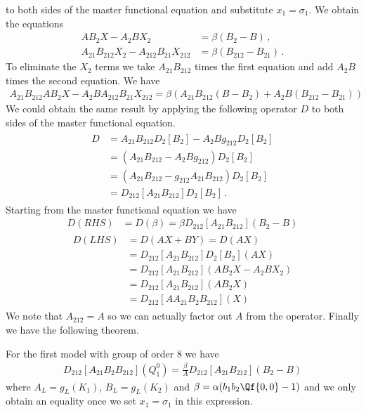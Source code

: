 to both sides of the master functional equation and substitute $x_1 = \sigma_1$. We obtain the equations
\begin{align}
	 AB_2 X - A_2 B X_2 &= \beta(B_2 - B)\,,\\
	  A_{21}B_{212} X_2 - A_{212} B_{21} X_{212} &= \beta(B_{212}-B_{21})\,.
\end{align}
To eliminate the $X_2$ terms we take $A_{21}B_{212}$ times the first equation and add $A_2 B$ times the second equation. We have
\begin{align}
	A_{21}B_{212}AB_2 X - A_2 BA_{212} B_{21} X_{212} = \beta(A_{21}B_{212}(B-B_2)+A_2 B(B_{212}-B_{21}))
\end{align}
We could obtain the same result by applying the following operator $D$ to both sides of the master functional equation.
\begin{align}\begin{split}
	D &=A_{21}B_{212} D_2[B_2] - A_2 B g_{212}D_2[B_2]\\
	   &= (A_{21}B_{212} - A_2 B g_{212})D_2[B_2]\\
	   &= (A_{21}B_{212} - g_{212}A_{21}B_{212})D_2[B_2]\\
	   &= D_{212}[A_{21}B_{212}]D_2[B_2]\,.
\end{split}\end{align}
Starting from the master functional equation we have
\begin{align}
	D(RHS) &= D(\beta) = \beta D_{212}[A_{21}B_{212}](B_2-B)
\end{align}
\begin{align}
\begin{split}
	D(LHS) &= D(AX+BY) = D(AX) \\
		&= D_{212}[A_{21}B_{212}]D_2[B_2](AX)\\
		&=D_{212}[A_{21}B_{212}](AB_2X - A_2BX_2)\\
		&=D_{212}[A_{21}B_{212}](AB_2X)\\
		&= D_{212}[AA_{21}B_2B_{212}](X)
\end{split}
\end{align}
We note that $A_{212} = A$ so we can actually factor out $A$ from the operator. Finally we have the following theorem.
\begin{theorem} For the first model with group of order 8 we have
\begin{align}
	D_{212}[A_{21}B_2B_{212}]\left(Q_1^0\right) = \frac{\beta}{A} D_{212}[A_{21}B_{212}](B_2-B)
\end{align}
where $A_L = g_L(K_1)$, $B_L = g_L(K_2)$ and $\beta = \alpha (b_1b_2\Qf{0,0}-1)$ and we only obtain an equality once we set $x_1 = \sigma_1$ in this expression.
\end{theorem}
